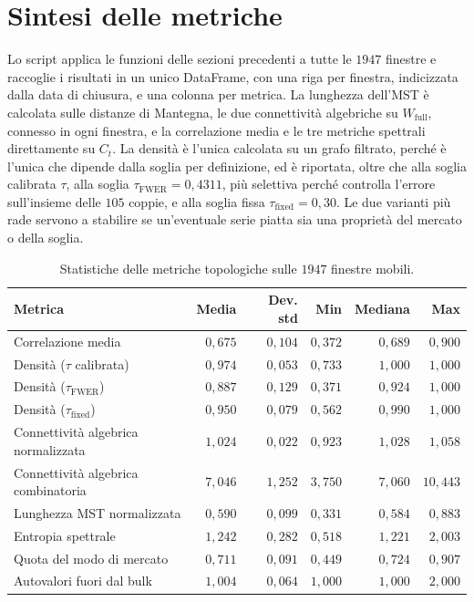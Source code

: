 \section{Sintesi delle metriche}
\label{sec:topo-orchestration}

Lo script  applica le funzioni delle sezioni precedenti a tutte le $1947$ finestre e raccoglie i risultati in un unico DataFrame, con una riga per finestra, indicizzata dalla data di chiusura, e una colonna per metrica. La lunghezza dell'MST è calcolata sulle distanze di Mantegna, le due connettività algebriche su $W_{\mathrm{full}}$, connesso in ogni finestra, e la correlazione media e le tre metriche spettrali direttamente su $C_t$. La densità è l'unica calcolata su un grafo filtrato, perché è l'unica che dipende dalla soglia per definizione, ed è riportata, oltre che alla soglia calibrata $\tau$, alla soglia $\tau_{\mathrm{FWER}}=0{,}4311$, più selettiva perché controlla l'errore sull'insieme delle $105$ coppie, e alla soglia fissa $\tau_{\mathrm{fixed}}=0{,}30$. Le due varianti più rade servono a stabilire se un'eventuale serie piatta sia una proprietà del mercato o della soglia.

\begin{table}[H]
\centering
\caption[Metriche topologiche sull'intero periodo]{Statistiche delle metriche topologiche sulle $1947$ finestre mobili.}
\label{tab:topo-summary}
\small
\begin{tabular}{@{}lrrrrr@{}}
\toprule
\textbf{Metrica} & \textbf{Media} & \textbf{Dev. std} & \textbf{Min} & \textbf{Mediana} & \textbf{Max} \\
\midrule
Correlazione media & $0{,}675$ & $0{,}104$ & $0{,}372$ & $0{,}689$ & $0{,}900$ \\
Densità ($\tau$ calibrata) & $0{,}974$ & $0{,}053$ & $0{,}733$ & $1{,}000$ & $1{,}000$ \\
Densità ($\tau_{\mathrm{FWER}}$) & $0{,}887$ & $0{,}129$ & $0{,}371$ & $0{,}924$ & $1{,}000$ \\
Densità ($\tau_{\mathrm{fixed}}$) & $0{,}950$ & $0{,}079$ & $0{,}562$ & $0{,}990$ & $1{,}000$ \\
Connettività algebrica normalizzata & $1{,}024$ & $0{,}022$ & $0{,}923$ & $1{,}028$ & $1{,}058$ \\
Connettività algebrica combinatoria & $7{,}046$ & $1{,}252$ & $3{,}750$ & $7{,}060$ & $10{,}443$ \\
Lunghezza MST normalizzata & $0{,}590$ & $0{,}099$ & $0{,}331$ & $0{,}584$ & $0{,}883$ \\
Entropia spettrale & $1{,}242$ & $0{,}282$ & $0{,}518$ & $1{,}221$ & $2{,}003$ \\
Quota del modo di mercato & $0{,}711$ & $0{,}091$ & $0{,}449$ & $0{,}724$ & $0{,}907$ \\
Autovalori fuori dal bulk & $1{,}004$ & $0{,}064$ & $1{,}000$ & $1{,}000$ & $2{,}000$ \\
\bottomrule
\end{tabular}
\end{table}

